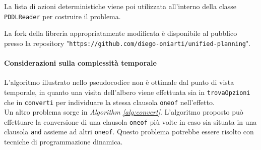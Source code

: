 \documentclass[a4paper, 11pt, titlepage, twoside, openany]{book}
\begin{document}
\begin{algorithm}
\caption{Sostituisci il primo oneof dell'azione con l'opzione indicata}\label{alg:Converti}
\end{algorithm}
La lista di azioni deterministiche viene poi utilizzata all'interno della classe \texttt{PDDLReader} per costruire il problema.

La fork della libreria appropriatamente modificata è disponibile al pubblico presso la repository "\texttt{https://github.com/diego-oniarti/unified-planning}".

\paragraph{Considerazioni sulla complessità temporale}
L'algoritmo illustrato nello pseudocodice non è ottimale dal punto di vista temporale, in quanto una visita dell'albero viene effettuata sia in \texttt{trovaOpzioni} che in \texttt{converti} per individuare la stessa clausola \texttt{oneof} nell'effetto. \\
Un altro problema sorge in \textit{Algorithm \ref{alg:convert}}. L'algoritmo proposto può effettuare la conversione di una clausola \texttt{oneof} più volte in caso sia situata in una clausola \texttt{and} assieme ad altri \texttt{oneof}. Questo problema potrebbe essere risolto con tecniche di programmazione dinamica.
\end{document}

